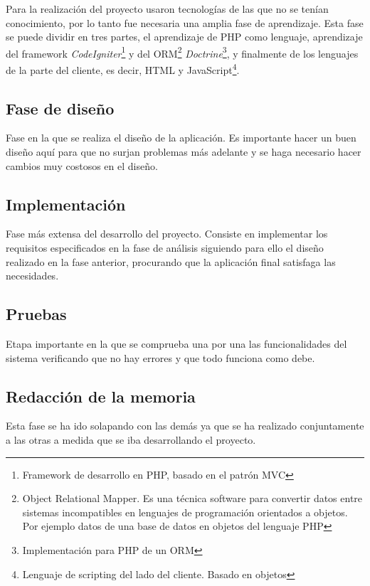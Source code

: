 \documentclass[a4paper,11pt]{article} %
\begin{document}
Para la realización del proyecto usaron tecnologías de las que no se tenían conocimiento, por lo tanto fue necesaria una amplia fase de aprendizaje. Esta fase se puede dividir en tres partes, el aprendizaje de PHP como lenguaje, aprendizaje del framework {\em CodeIgniter}\footnote{Framework de desarrollo en PHP, basado en el patrón MVC} y del ORM\footnote{Object Relational Mapper. Es una técnica software para convertir datos entre sistemas incompatibles en lenguajes de programación orientados a objetos. Por ejemplo datos de una base de datos en objetos del lenguaje PHP} {\em Doctrine}\footnote{Implementación para PHP de un ORM}, y finalmente de los lenguajes de la parte del cliente, es decir, HTML y JavaScript\footnote{Lenguaje de scripting del lado del cliente. Basado en objetos}.

\subsection{Fase de diseño}

Fase en la que se realiza el diseño de la aplicación. Es importante hacer un buen diseño aquí para que no surjan problemas más adelante y se haga necesario hacer cambios muy costosos en el diseño.

\subsection{Implementación}

Fase más extensa del desarrollo del proyecto. Consiste en implementar los requisitos especificados en la fase de análisis siguiendo para ello el diseño realizado en la fase anterior, procurando que la aplicación final satisfaga las necesidades.

\subsection{Pruebas}

Etapa importante en la que se comprueba una por una las funcionalidades del sistema verificando que no hay errores y que todo funciona como debe.

\subsection{Redacción de la memoria}
Esta fase se ha ido solapando con las demás ya que se ha realizado conjuntamente a las otras a medida que se iba desarrollando el proyecto. 
\end{document}
